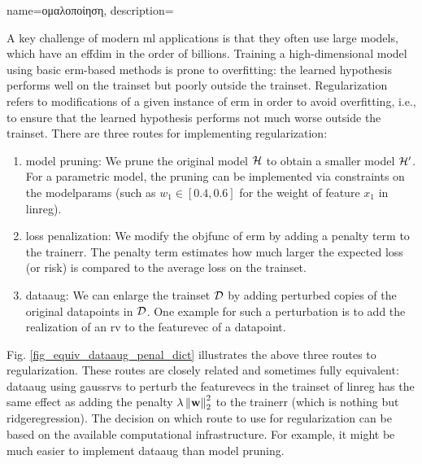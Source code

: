 {name={\foreignlanguage{greek}{ομαλοποίηση}}, 
	description={A key challenge of modern \gls{ml} applications is that they often 
		use large \gls{model}s, which have an \gls{effdim} in the order of billions. 
		Training a high-dimensional \gls{model} using basic \gls{erm}-based methods
		is prone to \gls{overfitting}: the learned \gls{hypothesis} performs well on the \gls{trainset} 
		but poorly outside the \gls{trainset}. Regularization refers to modifications of a given instance 
		of \gls{erm} in order to avoid \gls{overfitting}, i.e., to ensure that the learned \gls{hypothesis} performs 
		not much worse outside the \gls{trainset}. There are three routes for implementing 
		regularization: 
		\begin{enumerate}[label=\arabic*)]
			\item {\Gls{model} pruning:} We prune the original \gls{model} $\mathcal{H}$ to obtain a 
			smaller \gls{model} $\mathcal{H}'$. For a parametric \gls{model}, the pruning can be 
			implemented via constraints on the \gls{modelparams} (such as $w_{1} \in [0.4,0.6]$ for 
			the weight of \gls{feature} $x_{1}$ in \gls{linreg}).
			\item {\Gls{loss} penalization:} We modify the \gls{objfunc} of \gls{erm} by adding a 
			penalty term to the \gls{trainerr}. The penalty term estimates how much larger the expected \gls{loss} (or \gls{risk}) 
			is compared to the average \gls{loss} on the \gls{trainset}. 
			\item {\Gls{dataaug}:} We can enlarge the \gls{trainset} $\mathcal{D}$ by adding 
			perturbed copies of the original \gls{datapoint}s in $\mathcal{D}$. One example for such 
			a perturbation is to add the \gls{realization} of an \gls{rv} to the \gls{featurevec} 
			of a \gls{datapoint}. 
		\end{enumerate} 
		Fig. \ref{fig_equiv_dataaug_penal_dict} illustrates the above three routes to regularization. 
		These routes are closely related and sometimes fully equivalent: \gls{dataaug} using \gls{gaussrv}s 
		to perturb the \gls{featurevec}s in the \gls{trainset} of \gls{linreg} 
		has the same effect as adding the penalty 
		$\lambda \left\Vert {{\bf w}} \right\Vert_{2}^2$ to the \gls{trainerr} (which is nothing but \gls{ridgeregression}). 
        		The decision on which route to use for regularization can be based on the 
        		available computational infrastructure. For example, it might be much easier to 
       	 	implement \gls{dataaug} than \gls{model} pruning. 
		\begin{figure}[H]

\end{figure}}}

